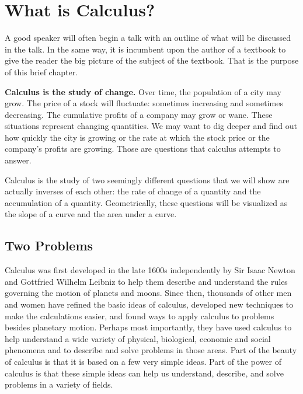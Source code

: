 \chapter{What is Calculus?}
\label{ch:whatiscalculus}


A good speaker will often begin a talk with an outline of what will be discussed in the talk. In the same way, it is incumbent upon the author of a textbook to give the reader the big picture of the subject of the textbook. That is the purpose of this brief chapter.

{\bf Calculus is the study of change.} Over time, the population of a city may grow. The price of a stock will fluctuate: sometimes increasing and sometimes decreasing. The cumulative profits of a company may grow or wane. These situations represent changing quantities. We may want to dig deeper and find out how quickly the city is growing or the rate at which the stock price or the company's profits are growing. Those are questions that calculus attempts to answer.

Calculus is the study of two seemingly different questions that we will show are actually inverses of each other: the rate of change of a quantity and the accumulation of a quantity. Geometrically, these questions will be visualized as the slope of a curve and the area under a curve.
\section{Two Problems}
\label{sec:twoproblems}

Calculus was first developed in the late 1600s independently by Sir Isaac Newton and Gottfried Wilhelm Leibniz to help them describe and understand the rules governing the motion of planets and moons. Since then, thousands of other men and women have refined the basic ideas of calculus, developed new techniques to make the calculations easier, and found ways to apply calculus to problems besides planetary motion. Perhaps most importantly, they have used calculus to help understand a wide variety of physical, biological, economic and social phenomena and to describe and solve problems in those areas.
Part of the beauty of calculus is that it is based on a few very simple ideas. Part of the power of calculus is that these simple ideas can help us understand, describe, and solve problems in a variety of fields.

